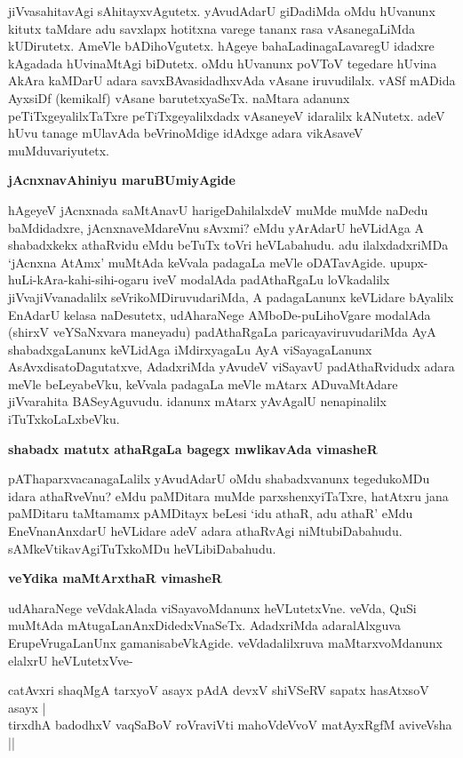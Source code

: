 \noindent
jiVvasahitavAgi sAhitayxvAgutetx. yAvudAdarU giDadiMda oMdu hUvanunx kitutx taMdare adu savxlapx hotitxna varege tananx rasa vAsanegaLiMda kUDirutetx. AmeVle bADihoVgutetx. hAgeye bahaLadinagaLavaregU idadxre kAgadada hUvinaMtAgi biDutetx. oMdu hUvanunx poVToV tegedare hUvina AkAra kaMDarU adara savxBAvasidadhxvAda vAsane iruvudilalx. vASf mADida AyxsiDf (kemikalf) vAsane barutetxyaSeTx. naMtara adanunx peTiTxgeyalilxTaTxre peTiTxgeyalilxdadx vAsaneyeV idaralilx kANutetx. adeV hUvu tanage mUlavAda beVrinoMdige idAdxge adara vikAsaveV muMduvariyutetx.

\newpage

{\bigskip
\noindent
{\large\bf jAcnxnavAhiniyu maruBUmiyAgide}}\label{page110c}
\medskip

\noindent
hAgeyeV jAcnxnada saMtAnavU harigeDahilalxdeV muMde muMde naDedu 
baMdidadxre, jAcnxnaveMdareVnu sAvxmi? eMdu yArAdarU heVLidAga A 
shabadxkekx athaRvidu eMdu beTuTx toVri heVLabahudu. adu ilalxdadxriMDa 
`jAcnxna AtAmx' muMtAda keVvala padagaLa meVle oDATavAgide. 
upupx-huLi-kAra-kahi-sihi-ogaru iveV modalAda padAthaRgaLu loVkadalilx 
jiVvajiVvanadalilx seVrikoMDiruvudariMda, A padagaLanunx keVLidare bAyalilx EnAdarU kelasa naDesutetx, udAharaNege AMboDe-puLihoVgare modalAda (shirxV veYSaNxvara maneyadu) padAthaRgaLa paricayaviruvudariMda AyA shabadxgaLanunx keVLidAga iMdirxyagaLu AyA viSayagaLanunx AsAvxdisatoDagutatxve, AdadxriMda yAvudeV viSayavU padAthaRvidudx adara meVle beLeyabeVku, keVvala padagaLa meVle mAtarx ADuvaMtAdare jiVvarahita BASeyAguvudu. idanunx mAtarx yAvAgalU nenapinalilx iTuTxkoLaLxbeVku.

{\bigskip
\noindent
{\large\bf shabadx matutx athaRgaLa bagegx mwlikavAda vimasheR}}\label{page111}
\medskip

\noindent
pAThaparxvacanagaLalilx yAvudAdarU oMdu shabadxvanunx tegedukoMDu idara 
athaRveVnu? eMdu paMDitara muMde parxshenxyiTaTxre, hatAtxru jana paMDitaru taMtamamx pAMDitayx beLesi `idu athaR, adu athaR' eMdu EneVnanAnxdarU heVLidare adeV adara athaRvAgi niMtubiDabahudu. sAMkeVtikavAgiTuTxkoMDu heVLibiDabahudu.

{\bigskip
\noindent
{\large\bf veYdika maMtArxthaR vimasheR}}\label{page111a}
\medskip

\noindent
udAharaNege veVdakAlada viSayavoMdanunx heVLutetxVne. veVda, QuSi 
muMtAda mAtugaLanAnxDidedxVnaSeTx. AdadxriMda adaralAlxguva 
ErupeVrugaLanUnx gamanisabeVkAgide. veVdadalilxruva maMtarxvoMdanunx elalxrU heVLutetxVve-

\begin{shloka}
catAvxri shaqMgA tarxyoV asayx pAdA devxV shiVSeRV sapatx hasAtxsoV asayx |\\\label{111}
tirxdhA badodhxV vaqSaBoV roVraviVti mahoVdeVvoV matAyxRgfM aviveVsha ||
\end{shloka}

